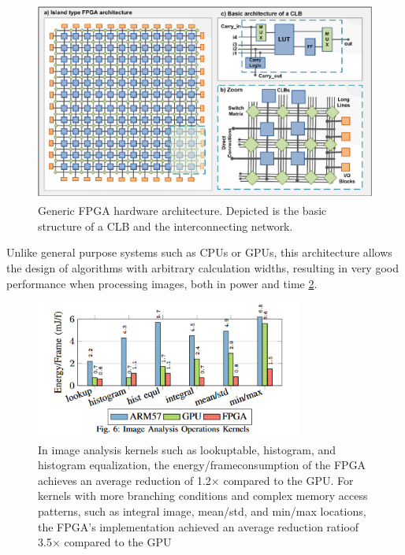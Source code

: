 \begin{figure}[h!]
\centering
\includegraphics[height=2.6in]{figures/clb.png}
\caption{Generic FPGA hardware architecture. Depicted is the basic structure of a CLB and the interconnecting network.}
  \label{fig:clb}
\end{figure}

\pagebreak

Unlike general purpose systems such as CPUs or GPUs, this architecture allows the design of algorithms with arbitrary calculation widths, resulting in very good performance when processing images, both in power and time \ref{fig:op_watt}.

\begin{figure}[h!]
\centering
\includegraphics[height=1.8in]{figures/op_watt.png}
\caption{In image analysis kernels  such  as  lookuptable, histogram, and histogram equalization, the energy/frameconsumption  of  the  FPGA  achieves  an  average  reduction  of 1.2× compared  to  the  GPU.  For  kernels  with  more branching  conditions  and  complex  memory  access  patterns, such as integral image, mean/std, and min/max locations, the FPGA’s  implementation  achieved  an  average  reduction  ratioof 3.5× compared to the GPU\cite{ochoa-ruiz_high-level_2012}}
  \label{fig:op_watt}
\end{figure}

\pagebreak

